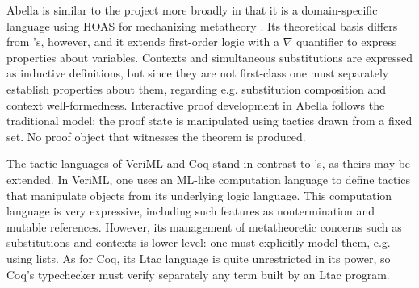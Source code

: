 Abella is similar to the \Beluga{} project more broadly in that it is a
domain-specific language using HOAS for mechanizing metatheory
\cite{Gacek:IJCAR08, Gacek:JAR12}.
Its theoretical basis differs from \Beluga's, however, and it extends
first-order logic with a $\nabla$ quantifier to express properties about
variables. Contexts and simultaneous substitutions are expressed as inductive
definitions, but since they are not first-class one must separately establish
properties about them, regarding e.g. substitution composition and context
well-formedness. Interactive proof development in Abella follows the traditional
model: the proof state is manipulated using tactics drawn from a fixed set. No
proof object that witnesses the theorem is produced.

The tactic languages of VeriML \cite{Stampoulis:ICFP10,Stampoulis:POPL12} and
Coq stand in contrast to \Harpoon's, as theirs may be extended.
In VeriML, one uses an ML-like computation language to define tactics that
manipulate objects from its underlying logic language.
This computation language is very expressive, including such features as
nontermination and mutable references.
However, its management of metatheoretic concerns such as substitutions and
contexts is lower-level: one must explicitly model them, e.g. using lists.
As for Coq, its Ltac language \cite{Delahaye:LPAR00} is quite
unrestricted in its power, so Coq's typechecker must verify separately any term
built by an Ltac program.


